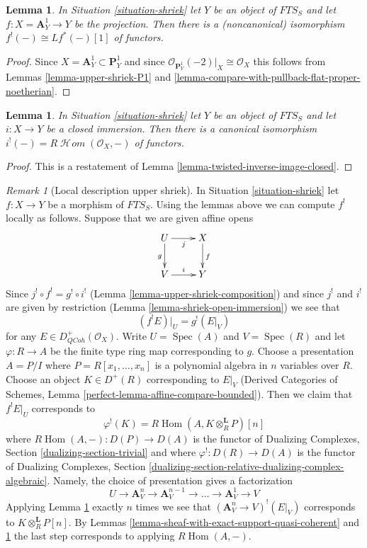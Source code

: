 \documentclass{stacks-project}
\theoremstyle{plain}
\newtheorem{lemma}[subsection]{Lemma}
\theoremstyle{definition}
\theoremstyle{remark}
\newtheorem{remark}[subsection]{Remark}
\numberwithin{equation}{subsection}
\def\Spec{\mathop{\mathrm{Spec}}}
\def\Hom{\mathop{\mathrm{Hom}}\nolimits}
\def\SheafHom{\mathop{\mathcal{H}\!\mathit{om}}\nolimits}
\def\QCoh{\mathit{QCoh}}
\begin{document}
\begin{lemma}
\label{lemma-shriek-affine-line}
In Situation \ref{situation-shriek} let $Y$ be an object of $\textit{FTS}_S$
and let $f : X = \mathbf{A}^1_Y \to Y$ be
the projection. Then there is a (noncanonical) isomorphism
$f^!(-) \cong Lf^*(-) [1]$ of functors.
\end{lemma}

\begin{proof}
Since $X = \mathbf{A}^1_Y \subset \mathbf{P}^1_Y$
and since $\mathcal{O}_{\mathbf{P}^1_Y}(-2)|_X \cong \mathcal{O}_X$
this follows from Lemmas \ref{lemma-upper-shriek-P1} and
\ref{lemma-compare-with-pullback-flat-proper-noetherian}.
\end{proof}

\begin{lemma}
\label{lemma-shriek-closed-immersion}
In Situation \ref{situation-shriek} let $Y$ be an object of
$\textit{FTS}_S$ and let $i : X \to Y$ be a closed immersion.
Then there is a canonical isomorphism
$i^!(-) = R\SheafHom(\mathcal{O}_X, -)$ of functors.
\end{lemma}

\begin{proof}
This is a restatement of Lemma \ref{lemma-twisted-inverse-image-closed}.
\end{proof}

\begin{remark}[Local description upper shriek]
\label{remark-local-calculation-shriek}
In Situation \ref{situation-shriek} let $f : X \to Y$ be a morphism of
$\textit{FTS}_S$. Using the lemmas above we can compute
$f^!$ locally as follows. Suppose that we are given affine opens
$$
\xymatrix{
U \ar[r]_j \ar[d]_g & X \ar[d]^f \\
V \ar[r]^i & Y
}
$$
Since $j^! \circ f^! = g^! \circ i^!$
(Lemma \ref{lemma-upper-shriek-composition})
and since $j^!$ and $i^!$ are given by restriction
(Lemma \ref{lemma-shriek-open-immersion})
we see that
$$
(f^!E)|_U = g^!(E|_V)
$$
for any $E \in D^+_\QCoh(\mathcal{O}_X)$. Write
$U = \Spec(A)$ and $V = \Spec(R)$ and let $\varphi : R \to A$
be the finite type ring map corresponding to $g$.
Choose a presentation $A = P/I$ where $P = R[x_1, \ldots, x_n]$
is a polynomial algebra in $n$ variables over $R$. Choose an
object $K \in D^+(R)$ corresponding to $E|_V$
(Derived Categories of Schemes, Lemma
\ref{perfect-lemma-affine-compare-bounded}).
Then we claim that $f^!E|_U$ corresponds to
$$
\varphi^!(K) = R\Hom(A, K \otimes_R^\mathbf{L} P)[n]
$$
where $R\Hom(A, -) : D(P) \to D(A)$ is the functor of
Dualizing Complexes, Section \ref{dualizing-section-trivial}
and where $\varphi^! : D(R) \to D(A)$ is the functor of
Dualizing Complexes, Section
\ref{dualizing-section-relative-dualizing-complex-algebraic}.
Namely, the choice of presentation
gives a factorization
$$
U \rightarrow \mathbf{A}^n_V \to \mathbf{A}^{n - 1}_V \to \ldots \to
\mathbf{A}^1_V \to V
$$
Applying Lemma \ref{lemma-shriek-affine-line} exactly $n$ times we see that
$(\mathbf{A}^n_V \to V)^!(E|_V)$ corresponds to
$K \otimes_R^\mathbf{L} P[n]$. By Lemmas
\ref{lemma-sheaf-with-exact-support-quasi-coherent} and
\ref{lemma-shriek-closed-immersion} the last step corresponds to
applying $R\Hom(A, -)$.
\end{remark}
\end{document}
